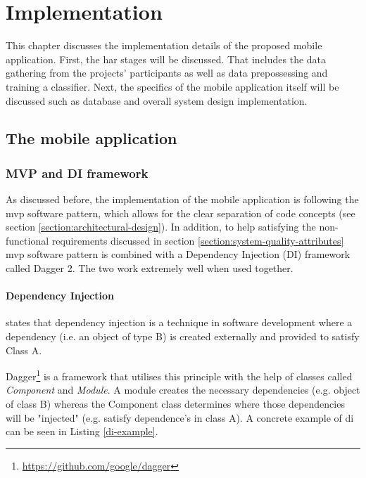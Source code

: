 \chapter{Implementation}
This chapter discusses the implementation details of the proposed mobile application. First, the \gls{har} stages will be discussed. That includes the data gathering from the projects' participants as well as data prepossessing and training a classifier. Next, the specifics of the mobile application itself will be discussed such as database and overall system design implementation.

\section{The mobile application}

    \subsection{MVP and DI framework}
    As discussed before, the implementation of the mobile application is following the \gls{mvp} software pattern, which allows for the clear separation of code concepts (see section \ref{section:architectural-design}). In addition, to help satisfying the non-functional requirements discussed in section \ref{section:system-quality-attributes}  \gls{mvp} software pattern is combined with a Dependency Injection (DI) framework called Dagger 2. The two work extremely well when used together.
    
    \subsubsection{Dependency Injection}
    \citet[]{realm2016} states that dependency injection is a technique in software development where a dependency (i.e. an object of type B) is created externally and provided to satisfy Class A. 
    
    Dagger\footnote{\url{https://github.com/google/dagger}} is a framework that utilises this principle with the help of classes called  \textit{Component} and \textit{Module}. A module creates the necessary dependencies (e.g. object of class B) whereas the Component class determines where those dependencies will be "injected" (e.g. satisfy dependence's in class A). A concrete example of \gls{di} can be seen in Listing \ref{di-example}. 
    
